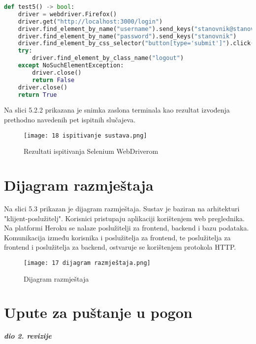 			\begin{lstlisting}[language=Python, breaklines=true]
def test5() -> bool:
    driver = webdriver.Firefox()
    driver.get("http://localhost:3000/login")
    driver.find_element_by_name("username").send_keys("stanovnik@stanovnik.com")
    driver.find_element_by_name("password").send_keys("stanovnik")
    driver.find_element_by_css_selector("button[type='submit']").click()
    try:
        driver.find_element_by_class_name("logout")
    except NoSuchElementException:
        driver.close()
        return False
    driver.close()
    return True
			\end{lstlisting}

			Na slici 5.2.2 prikazana je snimka zaslona terminala kao rezultat izvođenja prethodno navedenih pet ispitnih slučajeva.

			\begin{figure}[H]
					\centering
					\texttt{[image: 18 ispitivanje sustava.png]}
					\caption{Rezultati ispitivanja Selenium WebDriverom}
				\end{figure}
			\eject


		\section{Dijagram razmještaja}

		Na slici 5.3 prikazan je dijagram razmještaja. Sustav je baziran na arhitekturi "klijent-poslužitelj". Korisnici pristupaju aplikaciji korištenjem web preglednika. Na platformi Heroku se nalaze poslužitelji za frontend, backend i bazu podataka. Komunikacija između korisnika i poslužitelja za frontend, te poslužitelja za frontend i poslužitelja za backend, ostvaruje se korištenjem protokola HTTP.

			\begin{figure}[H]
					\centering
					\texttt{[image: 17 dijagram razmještaja.png]}
					\caption{Dijagram razmještaja}
				\end{figure}

			\eject

		\section{Upute za puštanje u pogon}

			\textbf{\textit{dio 2. revizije}}\\

